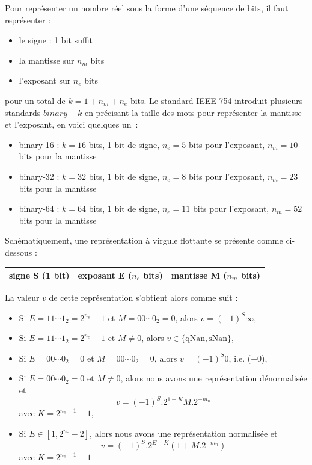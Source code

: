 Pour représenter un nombre réel sous la forme d'une séquence de bits, il faut représenter :
\begin{itemize}
\item le signe : 1 bit suffit
\item la mantisse sur $n_m$ bits
\item l'exposant sur $n_e$ bits
\end{itemize}
pour un total de $k = 1 + n_m + n_e$ bits. Le standard IEEE-754 introduit plusieurs standards $binary-k$ en précisant la taille des mots pour représenter la mantisse et l'exposant, en voici quelques un~:
\begin{itemize}
\item binary-16 : $k=16$ bits, 1 bit de signe, $n_e = 5$ bits pour l'exposant, $n_m=10$ bits pour la mantisse
\item binary-32 : $k=32$ bits, 1 bit de signe, $n_e = 8$ bits pour l'exposant, $n_m=23$ bits pour la mantisse
\item binary-64 : $k=64$ bits, 1 bit de signe, $n_e = 11$ bits pour l'exposant, $n_m=52$ bits pour la mantisse
\end{itemize}
Schématiquement, une représentation à virgule flottante se présente comme ci-dessous :

\begin{center}\begin{tabular}{|c|c|c|}
\hline
signe S (1 bit)& exposant E ($n_e$ bits)& mantisse M ($n_m$ bits)\\
\hline
\end{tabular}
\end{center}
La valeur $v$ de cette représentation s'obtient alors comme suit :
\begin{itemize}
\item Si $E = 11\cdots 1_2 = 2^{n_e} - 1$ et $M = 00\cdots 0_2 = 0$, alors $v = (-1)^S \infty$,
\item Si $E= 11\cdots 1_2 = 2^{n_e} - 1$ et $M \neq 0$, alors $v \in \{\mbox{qNan}, \mbox{sNan}\}$,
\item Si $E = 00\cdots 0_2 = 0$ et $M = 00\cdots 0_2 = 0$, alors $v = (-1)^S 0$, i.e. ($\pm 0$),
\item Si $E = 00\cdots 0_2 = 0$ et $M \neq 0$, alors nous avons une représentation dénormalisée et 
$$v = (-1)^S . 2^{1-K} M . 2^{-m_n}$$ avec $K = 2^{n_e-1}-1$,
\item Si $E \in [1, 2^{n_e} - 2]$, alors nous avons une représentation normalisée et 
$$v = (-1)^S . 2^{E - K} (1 + M . 2^{-m_n})$$
avec $K = 2^{n_e-1}-1$
\end{itemize}

